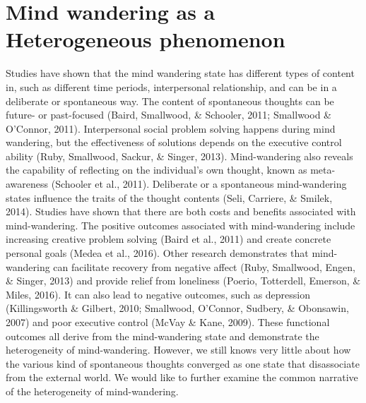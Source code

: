\section{Mind wandering as a Heterogeneous phenomenon}
\label{intro:heterogeneous}
Studies have shown that the mind wandering state has different types of content in, such as different time periods, interpersonal relationship, and can be in a deliberate or spontaneous way. The content of spontaneous thoughts can be future- or past-focused (Baird, Smallwood, \& Schooler, 2011; Smallwood \& O’Connor, 2011). Interpersonal social problem solving happens during mind wandering, but the effectiveness of solutions depends on the executive control ability (Ruby, Smallwood, Sackur, \& Singer, 2013). Mind-wandering also reveals the capability of reflecting on the individual’s own thought, known as meta-awareness (Schooler et al., 2011). Deliberate or a spontaneous mind-wandering states influence the traits of the thought contents (Seli, Carriere, \& Smilek, 2014). Studies have shown that there are both costs and benefits associated with mind-wandering. The positive outcomes associated with mind-wandering include increasing creative problem solving (Baird et al., 2011) and create concrete personal goals (Medea et al., 2016). Other research demonstrates that mind-wandering can facilitate recovery from negative affect (Ruby, Smallwood, Engen, \& Singer, 2013) and provide relief from loneliness (Poerio, Totterdell, Emerson, \& Miles, 2016). It can also lead to negative outcomes, such as depression (Killingsworth \& Gilbert, 2010; Smallwood, O’Connor, Sudbery, \& Obonsawin, 2007) and poor executive control (McVay \& Kane, 2009). These functional outcomes all derive from the mind-wandering state and demonstrate the heterogeneity of mind-wandering. However, we still knows very little about how the various kind of spontaneous thoughts converged as one state that disassociate from the external world. We would like to further examine the common narrative of the heterogeneity of mind-wandering.  
